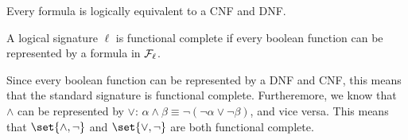 \bcoro

    Every formula is logically equivalent to a CNF and DNF.

\ecoro

\bdefn

    A logical signature $\ell$ is {\emphcolor functional complete} if every boolean function can
    be represented by a formula in ${\cal F}_\ell$.

\edefn

Since every boolean function can be represented by a DNF and CNF, this means that the standard
signature is functional complete.
Furtheremore, we know that $\land$ can be represented by $\lor$:
$\alpha\land\beta\equiv\neg(\neg\alpha\lor\neg\beta)$, and vice versa.
This means that $\set{{\land},\neg}$ and $\set{{\lor},\neg}$ are both functional complete.

